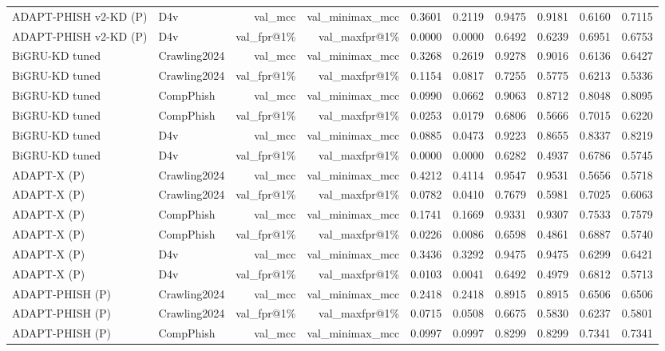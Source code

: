 \begin{table}[t]
\begin{tabular}{llrrrrrrrr}
ADAPT-PHISH v2-KD (P) & D4v & val\_mcc & val\_minimax\_mcc & 0.3601 & 0.2119 & 0.9475 & 0.9181 & 0.6160 & 0.7115 \\
ADAPT-PHISH v2-KD (P) & D4v & val\_fpr@1\% & val\_maxfpr@1\% & 0.0000 & 0.0000 & 0.6492 & 0.6239 & 0.6951 & 0.6753 \\
BiGRU-KD tuned & Crawling2024 & val\_mcc & val\_minimax\_mcc & 0.3268 & 0.2619 & 0.9278 & 0.9016 & 0.6136 & 0.6427 \\
BiGRU-KD tuned & Crawling2024 & val\_fpr@1\% & val\_maxfpr@1\% & 0.1154 & 0.0817 & 0.7255 & 0.5775 & 0.6213 & 0.5336 \\
BiGRU-KD tuned & CompPhish & val\_mcc & val\_minimax\_mcc & 0.0990 & 0.0662 & 0.9063 & 0.8712 & 0.8048 & 0.8095 \\
BiGRU-KD tuned & CompPhish & val\_fpr@1\% & val\_maxfpr@1\% & 0.0253 & 0.0179 & 0.6806 & 0.5666 & 0.7015 & 0.6220 \\
BiGRU-KD tuned & D4v & val\_mcc & val\_minimax\_mcc & 0.0885 & 0.0473 & 0.9223 & 0.8655 & 0.8337 & 0.8219 \\
BiGRU-KD tuned & D4v & val\_fpr@1\% & val\_maxfpr@1\% & 0.0000 & 0.0000 & 0.6282 & 0.4937 & 0.6786 & 0.5745 \\
ADAPT-X (P) & Crawling2024 & val\_mcc & val\_minimax\_mcc & 0.4212 & 0.4114 & 0.9547 & 0.9531 & 0.5656 & 0.5718 \\
ADAPT-X (P) & Crawling2024 & val\_fpr@1\% & val\_maxfpr@1\% & 0.0782 & 0.0410 & 0.7679 & 0.5981 & 0.7025 & 0.6063 \\
ADAPT-X (P) & CompPhish & val\_mcc & val\_minimax\_mcc & 0.1741 & 0.1669 & 0.9331 & 0.9307 & 0.7533 & 0.7579 \\
ADAPT-X (P) & CompPhish & val\_fpr@1\% & val\_maxfpr@1\% & 0.0226 & 0.0086 & 0.6598 & 0.4861 & 0.6887 & 0.5740 \\
ADAPT-X (P) & D4v & val\_mcc & val\_minimax\_mcc & 0.3436 & 0.3292 & 0.9475 & 0.9475 & 0.6299 & 0.6421 \\
ADAPT-X (P) & D4v & val\_fpr@1\% & val\_maxfpr@1\% & 0.0103 & 0.0041 & 0.6492 & 0.4979 & 0.6812 & 0.5713 \\
ADAPT-PHISH (P) & Crawling2024 & val\_mcc & val\_minimax\_mcc & 0.2418 & 0.2418 & 0.8915 & 0.8915 & 0.6506 & 0.6506 \\
ADAPT-PHISH (P) & Crawling2024 & val\_fpr@1\% & val\_maxfpr@1\% & 0.0715 & 0.0508 & 0.6675 & 0.5830 & 0.6237 & 0.5801 \\
ADAPT-PHISH (P) & CompPhish & val\_mcc & val\_minimax\_mcc & 0.0997 & 0.0997 & 0.8299 & 0.8299 & 0.7341 & 0.7341 \\

\end{tabular}
\end{table}
